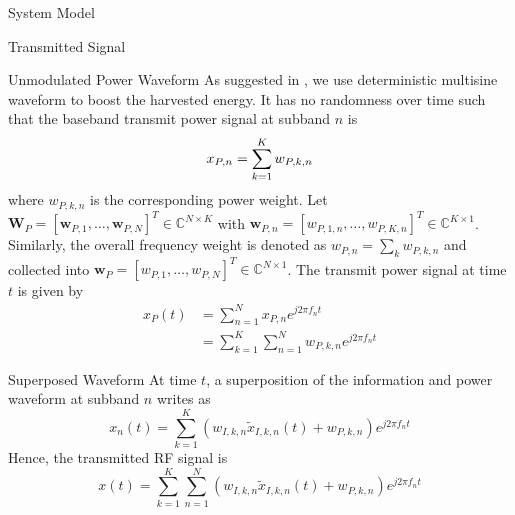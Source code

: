 \documentclass{IEEEtran}
\begin{document}
\begin{section}{System Model}
\begin{subsection}{Transmitted Signal}
		\begin{subsubsection}{Unmodulated Power Waveform}
			As suggested in \cite{Clerckx2018b,Clerckx2016a}, we use deterministic multisine waveform to boost the harvested energy. It has no randomness over time such that the baseband transmit power signal at subband $n$ is
			\begin{equation}\label{eq:x_{P,n}}
				x_{P,n}=\sum_{k=1}^K{w_{P,k,n}}
			\end{equation}
			where $w_{P,k,n}$ is the corresponding power weight. Let $\boldsymbol{W}_P=[\boldsymbol{w}_{P,1},\dots,\boldsymbol{w}_{P,N}]^T \in \mathbb{C}^{N \times K}$ with $\boldsymbol{w}_{P,n}=[w_{P,1,n},\dots,w_{P,K,n}]^T \in \mathbb{C}^{K \times 1}$. Similarly, the overall frequency weight is denoted as $w_{P,n}=\sum_k{w_{P,k,n}}$ and collected into $\boldsymbol{w}_P=[w_{P,1},\dots,w_{P,N}]^T \in \mathbb{C}^{N \times 1}$. The transmit power signal at time $t$ is given by
			\begin{equation}\label{eq:x_P(t)}
				\begin{split}
					x_P(t)
					&=\sum_{n=1}^N{x_{P,n}{e^{j2{\pi}{f_n}{t}}}}\\
					&=\sum_{k=1}^K\sum_{n=1}^N{w_{P,k,n}{e^{j2{\pi}{f_n}{t}}}}
				\end{split}
			\end{equation}
		\end{subsubsection}

		\begin{subsubsection}{Superposed Waveform}
			At time $t$, a superposition of the information and power waveform at subband $n$ writes as
			\begin{equation}\label{eq:x_n(t)}
				x_n(t)=\sum_{k=1}^K{(w_{I,k,n}\tilde{x}_{I,k,n}(t)+w_{P,k,n}){e^{j2{\pi}{f_n}{t}}}}
			\end{equation}
			Hence, the transmitted RF signal is
			\begin{equation}\label{eq:x(t)}
				x(t)=\sum_{k=1}^K\sum_{n=1}^N{(w_{I,k,n}\tilde{x}_{I,k,n}(t)+w_{P,k,n}){e^{j2{\pi}{f_n}{t}}}}
			\end{equation}
		\end{subsubsection}
	\end{subsection}


\end{section}
\end{document}
